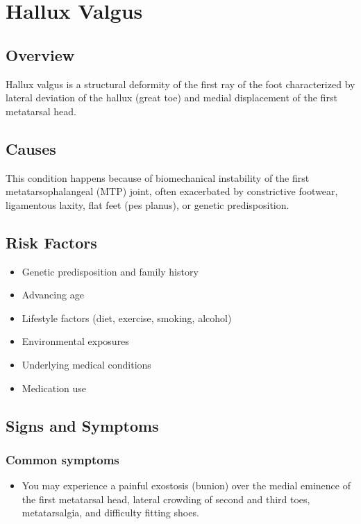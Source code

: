 \chapter{Hallux Valgus}
\label{sec:Hallux Valgus}

\section{Overview}
Hallux valgus is a structural deformity of the first ray of the foot characterized by lateral deviation of the hallux (great toe) and medial displacement of the first metatarsal head.
\section{Causes}
This condition happens because of biomechanical instability of the first metatarsophalangeal (MTP) joint, often exacerbated by constrictive footwear, ligamentous laxity, flat feet (pes planus), or genetic predisposition.     
\section{Risk Factors}

\begin{itemize}[noitemsep]
  \item Genetic predisposition and family history
  \item Advancing age
  \item Lifestyle factors (diet, exercise, smoking, alcohol)
  \item Environmental exposures
  \item Underlying medical conditions
  \item Medication use
\end{itemize}
\section{Signs and Symptoms}

\subsection{Common symptoms}
\begin{itemize}[noitemsep]
  \item You may experience a painful exostosis (bunion) over the medial eminence of the first metatarsal head, lateral crowding of second and third toes, metatarsalgia, and difficulty fitting shoes. 
  \end{itemize}

